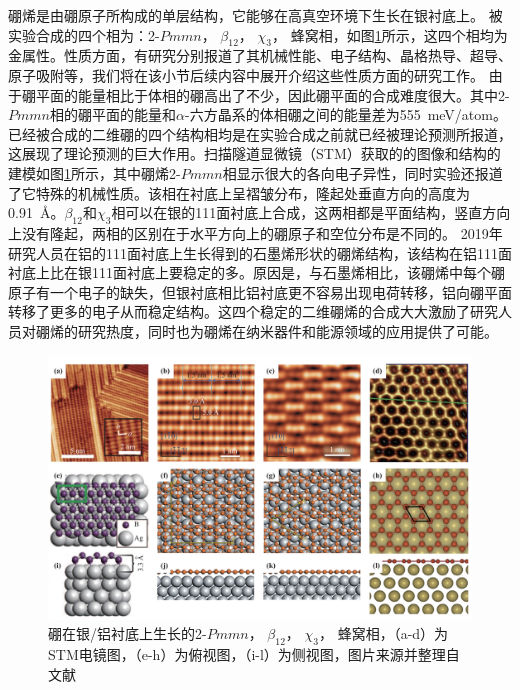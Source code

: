 硼烯是由硼原子所构成的单层结构，它能够在高真空环境下生长在银衬底上\cite{zhang2015two}。
被实验合成的四个相为：2-$Pmmn$， $\beta_{12}$， $\chi_3$， 蜂窝相，如图\ref{fig:boron4phase}所示，这四个相均为金属性。性质方面，有研究分别报道了其机械性能、电子结构、晶格热导、超导、原子吸附等\cite{penev2016can, xu2016nucleation, lopez2016electronic, peng2016electronic, carrete2016physically, wang2016strain, xiao2016enhanced, gao2017prediction, liu2016stable, yang2008ab, zabolotskiy2016strain, yuan2015effect, liu2013boron, zhang2016borophene, shu2016unveiling}，我们将在该小节后续内容中展开介绍这些性质方面的研究工作。
由于硼平面的能量相比于体相的硼高出了不少，因此硼平面的合成难度很大。其中2-$Pmmn$相的硼平面的能量和$\alpha$-六方晶系的体相硼之间的能量差为\SI{555}{\meV/atom}\cite{lherbier2016electronic}。已经被合成的二维硼的四个结构相均是在实验合成之前就已经被理论预测所报道，这展现了理论预测的巨大作用。扫描隧道显微镜（STM）获取的的图像和结构的建模如图\ref{fig:boron4phase}所示，其中硼烯2-$Pmmn$相显示很大的各向电子异性，同时实验还报道了它特殊的机械性质。该相在衬底上呈褶皱分布，隆起处垂直方向的高度为\SI{0.91}{\angstrom}。$\beta_{12}$和$\chi_3$相可以在银的111面衬底上合成，这两相都是平面结构，竖直方向上没有隆起，两相的区别在于水平方向上的硼原子和空位分布是不同的。
2019年研究人员在铝的111面衬底上生长得到的石墨烯形状的硼烯结构\cite{li2018experimental}，该结构在铝111面衬底上比在银111面衬底上要稳定的多。原因是，与石墨烯相比，该硼烯中每个硼原子有一个电子的缺失，但银衬底相比铝衬底更不容易出现电荷转移，铝向硼平面转移了更多的电子从而稳定结构。这四个稳定的二维硼烯的合成大大激励了研究人员对硼烯的研究热度，同时也为硼烯在纳米器件和能源领域的应用提供了可能。

\begin{figure}[bt]
  \includegraphics[width=1.0\textwidth]{figs/ch1_boron4phase.png}
  \centering
  \caption{硼在银/铝衬底上生长的2-$Pmmn$， $\beta_{12}$， $\chi_3$， 蜂窝相，（a-d）为STM电镜图，（e-h）为俯视图，（i-l）为侧视图，图片来源并整理自文献\cite{mannix2015synthesis,li2018experimental,feng2016experimental}}
  \label{fig:boron4phase}
\end{figure}

